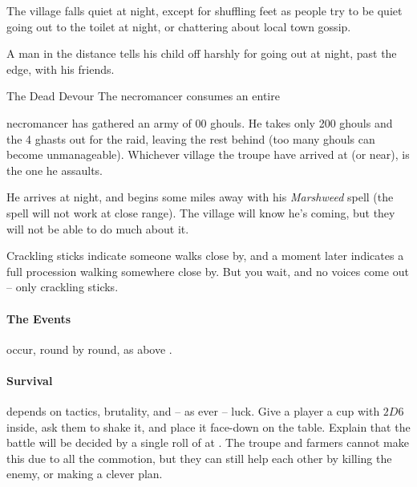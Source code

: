\begin{boxtext}
  The \gls{village} falls quiet at night, except for shuffling feet as people try to be quiet going out to the toilet at night, or chattering about local town gossip.

  A man in the distance tells his child off harshly for going out at night, past the \gls{edge}, with his friends.
\end{boxtext}


{The Dead Devour}%
{The necromancer consumes an entire }%

\Gls{necromancer} has gathered an army of 00 ghouls.
He takes only 200 ghouls and the 4 ghasts out for the raid, leaving the rest behind (too many ghouls can become unmanageable).
Whichever \gls{village} the troupe have arrived at (or near), is the one he assaults.

He arrives at night, and begins some miles away with his \textit{Marshweed} spell (the spell will not work at close range).
The \gls{village} will know he's coming, but they will not be able to do much about it.

\begin{boxtext}
  Crackling sticks indicate someone walks close by, and a moment later indicates a full procession walking somewhere close by.
  But you wait, and no voices come out -- only crackling sticks.
\end{boxtext}

\deathStormSpell




\paragraph{The Events}
occur, round by round, as above .

\paragraph{Survival}
depends on tactics, brutality, and -- as ever -- luck.
Give a player a cup with $2D6$ inside, ask them to shake it, and place it face-down on the table.
Explain that the battle will be decided by a single roll of  at \tn[16].
The troupe and farmers cannot make this  due to all the commotion, but they can still help each other by killing the enemy, or making a clever plan.

